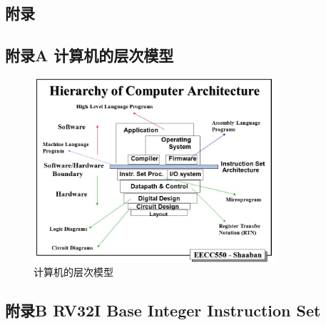 \begin{ujnappendix}
\section[附录]{附\qquad 录}
\subsection*{附录A 计算机的层次模型}
\begin{figure}[htbp]
\centering
\includegraphics[width=0.8\textwidth]{figures/computer-arch.png}
\caption{计算机的层次模型}
\label{fig:computer-arch}
\end{figure}
\subsection*{附录B RV32I Base Integer Instruction Set}

\end{ujnappendix}
